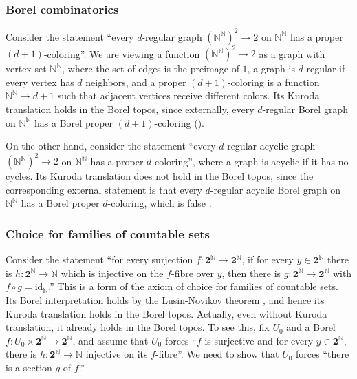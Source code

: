 \documentclass[11pt]{amsart}
\newcommand\id{\mathrm{id}}
\newcommand{\N}{\mathbb{N}}
\newcommand\two{\mathbf{2}}
\theoremstyle{definition}
\theoremstyle{remark}
\theoremstyle{plain}
\begin{document}
\subsubsection{Borel combinatorics}
Consider the statement
``every $d$-regular graph $(\N^\N)^2 \to 2$ on $\N^\N$ has a proper $(d+1)$-coloring''.
We are viewing a function $(\N^\N)^2 \to 2$ as a graph with vertex set $\N^\N$,
where the set of edges is the preimage of $1$,
a graph is $d$-regular if every vertex has $d$ neighbors,
and a proper $(d+1)$-coloring is a function $\N^\N \to d+1$
such that adjacent vertices receive different colors.
Its Kuroda translation holds in the Borel topos,
since externally,
every $d$-regular Borel graph on $\N^\N$ has a Borel proper $(d+1)$-coloring
(\cite{KST99}).

On the other hand,
consider the statement
``every $d$-regular acyclic graph $(\N^\N)^2 \to 2$ on $\N^\N$ has a proper $d$-coloring'',
where a graph is acyclic if it has no cycles.
Its Kuroda translation does not hold in the Borel topos,
since the corresponding external statement is that
every $d$-regular acyclic Borel graph on $\N^\N$ has a Borel proper $d$-coloring,
which is false \cite{Mar16}.

\subsubsection{Choice for families of countable sets} \label{subsubsec:countable-choice}
Consider the statement
``for every surjection \( f \colon \two^\N \to \two^\N \),
  if for every \( y \in \two^\N \)
  there is \( h \colon \two^\N \to \N \)
  which is injective on the \( f \)-fibre over \( y \),
  then there is \( g \colon \two^\N \to \two^\N \) with \( f \circ g = \id_\N \).''
This is a form of the axiom of choice for families of countable sets.
Its Borel interpretation holds by the Lusin-Novikov theorem
\cite[Theorem~18.10]{kechris-classical},
and hence its Kuroda translation holds in the Borel topos.
Actually,
even without Kuroda translation,
it already holds in the Borel topos.
To see this,
fix \( U_0 \) and a Borel \( f \colon U_0 \times \two^\N \to \two^\N \),
and assume that \( U_0 \) forces
``\( f \) is surjective
and for every \( y \in \two^\N \),
there is \( h \colon \two^\N \to \N \)
injective on its \( f \)-fibre''.
We need to show that \( U_0 \) forces
``there is a section \( g \) of \( f \).''
\end{document}
